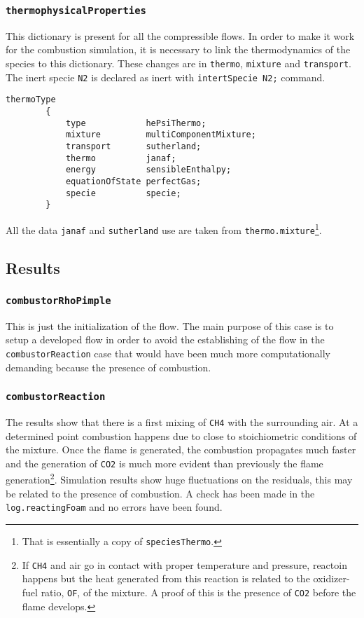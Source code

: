     \cprotect\subsubsection{\verb|thermophysicalProperties|}
    This dictionary is present for all the compressible flows. In order to make it work for the combustion simulation, it is necessary to link the thermodynamics of the species to this dictionary. These changes are in \verb|thermo|, \verb|mixture| and \verb|transport|. The inert specie \verb|N2| is declared as inert with \verb|intertSpecie N2;| command. 
    \begin{lstlisting}[caption = $\mathtt{combustorReaction/constant/thermophysicalProperties}$. This is the main link between the combustion model and the momentum transport equation., label = list:thermoProp]
        thermoType
        {
            type            hePsiThermo;
            mixture         multiComponentMixture;
            transport       sutherland;
            thermo          janaf;
            energy          sensibleEnthalpy;
            equationOfState perfectGas;
            specie          specie;
        }
    \end{lstlisting}
    All the data \verb|janaf| and \verb|sutherland| use are taken from \verb|thermo.mixture|\cprotect\footnote{That is essentially a copy of \verb|speciesThermo|.}.

    \subsection{Results}
    \cprotect\subsubsection{\verb|combustorRhoPimple|}
    This is just the initialization of the flow. The main purpose of this case is to setup a developed flow in order to avoid the establishing of the flow in the \verb|combustorReaction| case that would have been much more computationally demanding because the presence of combustion.

    \cprotect\subsubsection{\verb|combustorReaction|}
    The results show that there is a first mixing of \verb|CH4| with the surrounding air. At a determined point combustion happens due to close to stoichiometric conditions of the mixture. Once the flame is generated, the combustion propagates much faster and the generation of \verb|CO2| is much more evident than previously the flame generation\cprotect\footnote{If \verb|CH4| and air go in contact with proper temperature and pressure, reactoin happens but the heat generated from this reaction is related to the oxidizer-fuel ratio, \verb|OF|, of the mixture. A proof of this is the presence of \verb|CO2| before the flame develops.}. Simulation results show huge fluctuations on the residuals, this may be related to the presence of combustion. A check has been made in the \verb|log.reactingFoam| and no errors have been found.

